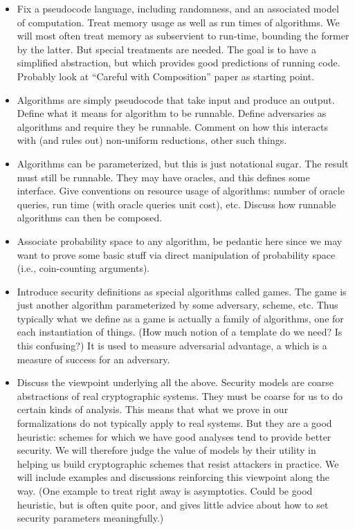 \begin{itemize}
  \item Fix a pseudocode language, including randomness, and an associated model
    of computation. Treat memory usage as well as run times of algorithms. We
    will most often treat memory as subservient to run-time, bounding the former
    by the latter. But special treatments are needed.
    The goal is to have a simplified abstraction, but which
    provides good predictions of running code.  Probably look at ``Careful with
    Composition'' paper as starting point.

 \item Algorithms are simply pseudocode that take input and produce an output.
    Define what it means for algorithm to be runnable. Define adversaries
    as algorithms and require they be runnable. Comment on how this interacts
    with (and rules out) non-uniform reductions, other such things.

  \item  Algorithms can be parameterized, but this is just notational sugar. The result
    must still be runnable. They may have oracles, and this defines some
    interface.  Give conventions on resource usage of algorithms: number of
    oracle queries, run time (with oracle queries unit cost), etc. Discuss how
    runnable algorithms can then be composed.

  \item Associate probability space to any algorithm, be pedantic here since we
    may want to prove some basic stuff via direct manipulation of probability
    space (i.e., coin-counting arguments).


  \item Introduce security definitions as special algorithms called games. The
    game is just another algorithm parameterized by some adversary, scheme, etc.
    Thus typically what we define as a game is actually a family of algorithms,
    one for each instantiation of things. (How much notion of a template do we
    need? Is this confusing?) It is used to measure adversarial advantage, a
    which is a measure of success for an adversary.

  \item Discuss the viewpoint underlying all the above. Security models are
    coarse abstractions of real cryptographic systems. They must be coarse for
    us to do certain kinds of analysis. This means that what we prove in our
    formalizations do not typically apply to real systems. But they are a good
    heuristic: schemes for which we have good analyses tend to provide better
    security. We will therefore judge the value of models by their utility in
    helping us build cryptographic schemes that resist attackers in practice.
    We will include examples and discussions reinforcing this viewpoint along
    the way. (One example to treat right away is asymptotics. Could be good
    heuristic, but is often quite poor, and gives little advice about how to set security
    parameters meaningfully.)


\end{itemize}
